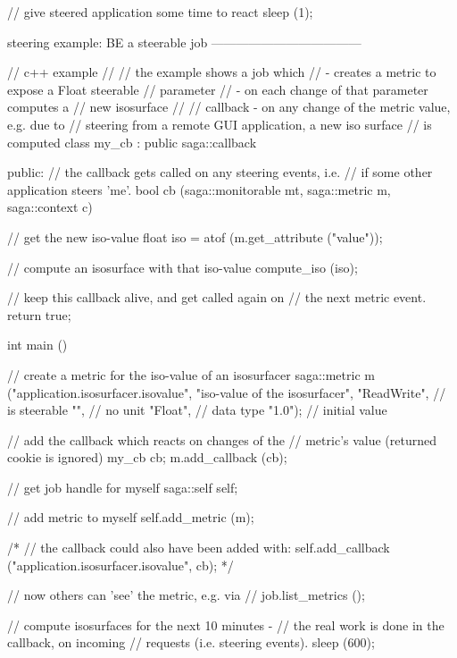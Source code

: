\begin{mycode}
{{        // give steered application some time to react
        sleep (1);
      }
    }
 
 
 
  steering example: BE a steerable job
  ------------------------------------
 
    // c++ example
    //
    // the example shows a job which
    //  - creates a metric to expose a Float steerable
    //    parameter
    //  - on each change of that parameter computes a
    //    new isosurface
    //
    // callback - on any change of the metric value, e.g. due to
    // steering from a remote GUI application, a new iso surface
    // is computed
    class my_cb : public saga::callback
    {
      public:
        // the callback gets called on any steering events, i.e.
        // if some other application steers 'me'.
        bool cb (saga::monitorable mt, 
                 saga::metric      m, 
                 saga::context     c)
        {
          // get the new iso-value
          float iso = atof (m.get_attribute ("value"));
 
          // compute an isosurface with that iso-value
          compute_iso (iso);
 
          // keep this callback alive, and get called again on
          // the next metric event.
           return true;
        }
     }
 
    int main ()
    {
      // create a metric for the iso-value of an isosurfacer
      saga::metric m ("application.isosurfacer.isovalue",
                      "iso-value of the isosurfacer",
                      "ReadWrite",   // is steerable
                      "",            // no unit
                      "Float",       // data type
                      "1.0");        // initial value
 
      // add the callback which reacts on changes of the
      // metric's value (returned cookie is ignored)
      my_cb cb;
      m.add_callback (cb);
 
      // get job handle for myself
      saga::self self;
 
      // add metric to myself
      self.add_metric (m);
 
      /*
      // the callback could also have been added with:
      self.add_callback ("application.isosurfacer.isovalue", cb);
      */
 
      // now others can 'see' the metric, e.g. via
      // job.list_metrics ();
 
      // compute isosurfaces for the next 10 minutes -
      // the real work is done in the callback, on incoming
      // requests (i.e. steering events).
      sleep (600);
 
}
\end{mycode}
